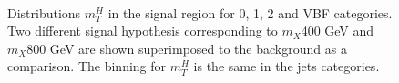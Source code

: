 \begin{figure}[htbp]
\centering
{}
\\
\caption{Distributions  $m_T^H$ in the signal region for 0, 1, 2 and VBF categories. Two different signal hypothesis corresponding to $m_X $400 GeV and $m_X $800 GeV are shown superimposed to the background as a comparison. The binning for  $m_T^H$ is the same in the jets categories.}
    \label{fig:mth_sigOF}
\end{figure}



